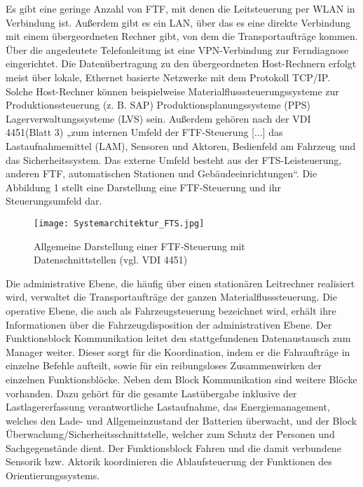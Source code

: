 Es gibt eine geringe Anzahl von FTF, mit denen die Leitsteuerung per WLAN in Verbindung ist.
Au\ss erdem gibt es ein LAN, \"uber das es eine direkte Verbindung mit einem \"ubergeordneten Rechner gibt, von dem die Transportauftr\"age kommen.
\"Uber die angedeutete Telefonleitung ist eine VPN-Verbindung zur Ferndiagnose eingerichtet.
Die Daten\"ubertragung zu den \"ubergeordneten Host-Rechnern erfolgt meist \"uber lokale, Ethernet basierte Netzwerke mit dem Protokoll TCP/IP.
Solche Host-Rechner k\"onnen beispielweise Materialflusssteuerungssysteme zur Produktionssteuerung (z. B. SAP) 
Produktionsplanungssysteme (PPS) Lagerverwaltungssysteme (LVS) sein\cite[vgl.][S. 96]{Guenther:2011}. 
Au\ss erdem geh\"oren nach der VDI 4451(Blatt 3) „zum internen Umfeld der FTF-Steuerung [...] das Lastaufnahmemittel (LAM), 
Sensoren und Aktoren, Bedienfeld am Fahrzeug und das Sicherheitssystem.
Das externe Umfeld besteht aus der FTS-Leisteuerung, anderen FTF, automatischen Stationen und Geb\"audeeinrichtungen“.
Die Abbildung 1 stellt eine Darstellung eine FTF-Steuerung und ihr Steuerungsumfeld dar.
	\begin{figure}[h!]
		\centering
		\texttt{[image: Systemarchitektur\_FTS.jpg]}
		\caption{Allgemeine Darstellung einer FTF-Steuerung mit Datenschnittstellen (vgl. VDI 4451)}
		\label{Wertschoepfungskette}
	\end{figure}
Die administrative Ebene, die h\"aufig \"uber einen station\"aren Leitrechner realisiert wird, verwaltet die Transportauftr\"age der ganzen Materialflusssteuerung.
Die operative Ebene, die auch als Fahrzeugsteuerung bezeichnet wird, erh\"alt ihre Informationen \"uber die Fahrzeugdisposition der administrativen Ebene.
Der Funktionsblock Kommunikation leitet den stattgefundenen Datenaustausch zum Manager weiter.
Dieser sorgt f\"ur die Koordination, indem er die Fahrauftr\"age in einzelne Befehle aufteilt, sowie f\"ur ein reibungsloses Zusammenwirken der einzelnen Funktionsbl\"ocke.
Neben dem Block Kommunikation sind weitere Bl\"ocke vorhanden.
Dazu geh\"ort f\"ur die gesamte Last\"ubergabe inklusive der Lastlagererfassung verantwortliche Lastaufnahme, 
das Energiemanagement, welches den Lade- und Allgemeinzustand der Batterien \"uberwacht, und der Block \"Uberwachung/Sicherheitsschnittstelle, 
welcher zum Schutz der Personen und Sachgegenst\"ande dient.
Der Funktionsblock Fahren und die damit verbundene Sensorik bzw. Aktorik koordinieren die Ablaufsteuerung der Funktionen des Orientierungssystems\cite[S. 33]{Langenbach:2012}.

